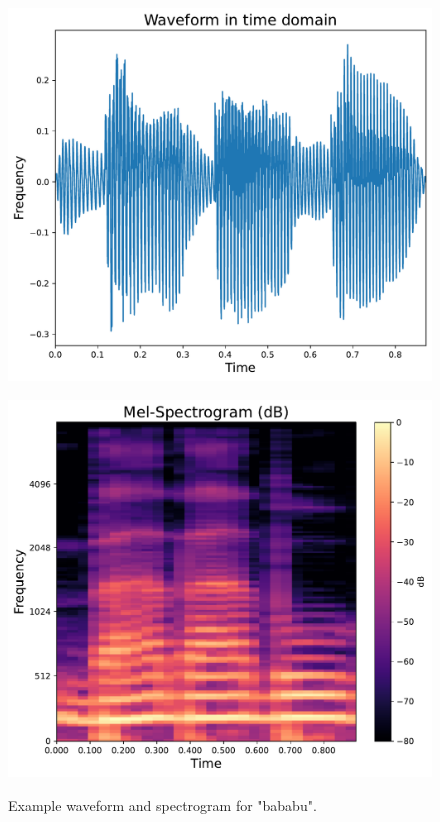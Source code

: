 \begin{figure}[h]
	\centering
	\begin{minipage}[b]{0.4\linewidth}
		\includegraphics[width=\linewidth]{"graphs/sectr_example/Waveform in time domain"}
		\label{fig:waveform-in-time-domain}
	\end{minipage}
	\hfill
	\begin{minipage}[b]{0.4\linewidth}
		\includegraphics[width=\linewidth]{"graphs/sectr_example/Mel-Spectrogram (dB)"}
		\label{fig:mel-spectrogram-db}
	\end{minipage}
	\caption{Example waveform and spectrogram for "bababu".}
	\label{fig:example_mel_bababu}
\end{figure}
